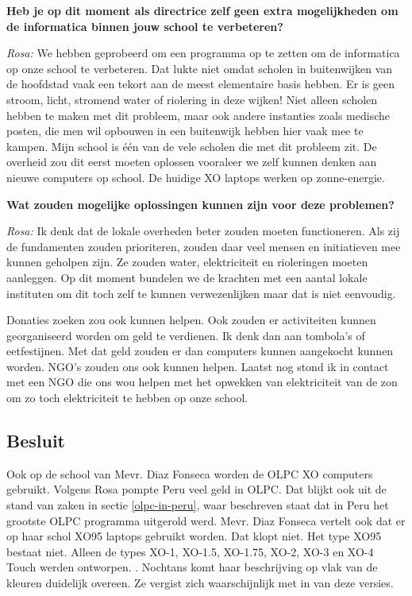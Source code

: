 \textbf{Heb je op dit moment als directrice zelf geen extra mogelijkheden om de informatica binnen jouw school te verbeteren?}

\textit{Rosa:} We hebben geprobeerd om een programma op te zetten om de informatica op onze school te verbeteren. Dat lukte niet omdat scholen in buitenwijken van de hoofdstad vaak een tekort aan de meest elementaire basis hebben. Er is geen stroom, licht, stromend water of riolering in deze wijken! Niet alleen scholen hebben te maken met dit probleem, maar ook andere instanties zoals medische posten, die men wil opbouwen in een buitenwijk hebben hier vaak mee te kampen. Mijn school is één van de vele scholen die met dit probleem zit. De overheid zou dit eerst moeten oplossen vooraleer we zelf kunnen denken aan nieuwe computers op school. De huidige XO laptops werken op zonne-energie. 

\textbf{Wat zouden mogelijke oplossingen kunnen zijn voor deze problemen?}

\textit{Rosa:} Ik denk dat de lokale overheden beter zouden moeten functioneren. Als zij de fundamenten zouden prioriteren, zouden daar veel mensen en initiatieven mee kunnen geholpen zijn. Ze zouden water, elektriciteit en rioleringen moeten aanleggen. Op dit moment bundelen we de krachten met een aantal lokale instituten om dit toch zelf te kunnen verwezenlijken maar dat is niet eenvoudig. 

Donaties zoeken zou ook kunnen helpen. Ook zouden er activiteiten kunnen georganiseerd worden om geld te verdienen. Ik denk dan aan tombola's of eetfestijnen. Met dat geld zouden er dan computers kunnen aangekocht kunnen worden. NGO's zouden ons ook kunnen helpen. Laatst nog stond ik in contact met een NGO die ons wou helpen met het opwekken van elektriciteit van de zon om zo toch elektriciteit te hebben op onze school.

\subsection{Besluit}
Ook op de school van Mevr. Diaz Fonseca worden de OLPC XO computers gebruikt. Volgens Rosa pompte Peru veel geld in OLPC. Dat blijkt ook uit de stand van zaken in sectie \ref{olpc-in-peru}, waar beschreven staat dat in Peru het grootste OLPC programma uitgerold werd. Mevr. Diaz Fonseca vertelt ook dat er op haar schol XO95 laptops gebruikt worden. Dat klopt niet. Het type XO95 bestaat niet. Alleen de types XO-1, XO-1.5, XO-1.75, XO-2, XO-3 en XO-4 Touch werden ontworpen. \autocite{OLPC2016}. Nochtans komt haar beschrijving op vlak van de kleuren duidelijk overeen. Ze vergist zich waarschijnlijk met in van deze versies.

